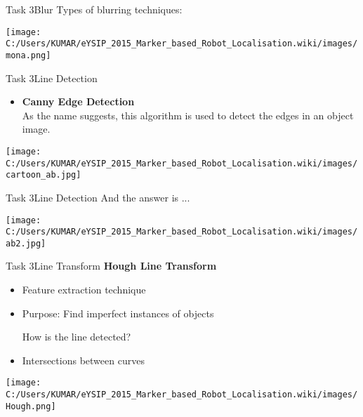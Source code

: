 \documentclass[10pt, a4paper]{beamer}
\begin{document}
\begin{frame}{Task 3}{Blur}
	Types of blurring techniques:\\
		\begin{minipage}{0.5\textwidth}
			\centering
			\texttt{[image: C:/Users/KUMAR/eYSIP\_2015\_Marker\_based\_Robot\_Localisation.wiki/images/mona.png]}
			\label{fig:sfig4}
			
			
		\end{minipage}		
	

		
\end{frame}			

\begin{frame}{Task 3}{Line Detection}

	\begin{itemize}
		\item \textbf{Canny Edge Detection}\\
		As the name suggests, this algorithm is used to detect the edges in an object image.
		
		
	\end{itemize}
	\begin{minipage}{0.5\textwidth}
		\centering
		\texttt{[image: C:/Users/KUMAR/eYSIP\_2015\_Marker\_based\_Robot\_Localisation.wiki/images/cartoon\_ab.jpg]}
		\label{fig:sfig4}
		
		
	\end{minipage}	
		
\end{frame}	
\begin{frame}{Task 3}{Line Detection}
	And the answer is ...\\
	\begin{minipage}{0.5\textwidth}
		\centering
		\texttt{[image: C:/Users/KUMAR/eYSIP\_2015\_Marker\_based\_Robot\_Localisation.wiki/images/ab2.jpg]}
		\label{fig:sfig4}
		
		
	\end{minipage}	
	
	
\end{frame}	
\begin{frame}{Task 3}{Line Transform}
	\textbf{Hough Line Transform}\\
	\begin{itemize}
		\item Feature extraction technique
		\item Purpose: Find imperfect instances of objects
		\begin{block}{How is the line detected?}\end{block}
		\item Intersections between curves
    \end{itemize}	
    \begin{minipage}{0.5\textwidth}
    	\centering
    	\texttt{[image: C:/Users/KUMAR/eYSIP\_2015\_Marker\_based\_Robot\_Localisation.wiki/images/Hough.png]}
    	\label{fig:sfig4}
    	
    	
    \end{minipage}
\end{frame}	
\end{document}
